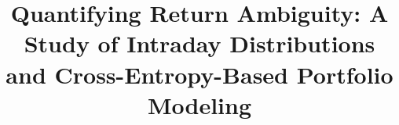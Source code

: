 \documentclass[preprint,12pt,authoryear]{elsarticle}
\begin{document}
\begin{frontmatter}



\title{Quantifying Return Ambiguity: A Study of Intraday Distributions and Cross-Entropy-Based Portfolio Modeling} %





\end{frontmatter}
\end{document}
